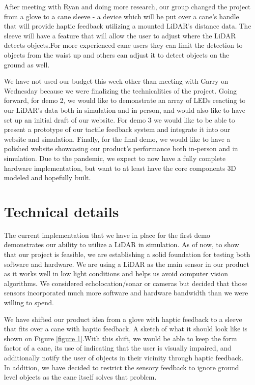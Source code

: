 \documentclass{article}
\begin{document}
After meeting with Ryan and doing more research, our group changed the project from a glove to a cane sleeve - a device which will be put over a cane's handle that will provide haptic feedback utilizing a mounted LiDAR's distance data. The sleeve will have a feature that will allow the user to adjust where the LiDAR detects objects.For more experienced cane users they can limit the detection to objects from the waist up and others can adjust it to detect objects on the ground as well. 

We have not used our budget this week other than meeting with Garry on Wednesday because we were finalizing the technicalities of the project. Going forward, for demo 2, we would like to demonstrate an array of LEDs reacting to our LiDAR's data both in simulation and in person, and would also like to have set up an initial draft of our website. For demo 3 we would like to be able to present a prototype of our tactile feedback system and integrate it into our website and simulation. Finally, for the final demo, we would like to have a polished website showcasing our product's performance both in-person and in simulation. Due to the pandemic, we expect to now have a fully complete hardware implementation, but want to at least have the core components 3D modeled and hopefully built.

\newblock
\section{Technical details}

The current implementation that we have in place for the first demo demonstrates our ability to utilize a LiDAR in simulation. As of now, to show that our project is feasible, we are establishing a solid foundation for testing both software and hardware. We are using a LiDAR as the main sensor in our product as it works well in low light conditions and helps us avoid computer vision algorithms. We considered echolocation/sonar or cameras but decided that those sensors incorporated much more software and hardware bandwidth than we were willing to spend.

We have shifted our product idea from a glove with haptic feedback to a sleeve that fits over a cane with haptic feedback. A sketch of what it should look like is shown on Figure \ref{figure 1}.With this shift, we would be able to keep the form factor of a cane, its use of indicating that the user is visually impaired, and additionally notify the user of objects in their vicinity through haptic feedback. In addition, we have decided to restrict the sensory feedback to ignore ground level objects as the cane itself solves that problem. 
\end{document}

